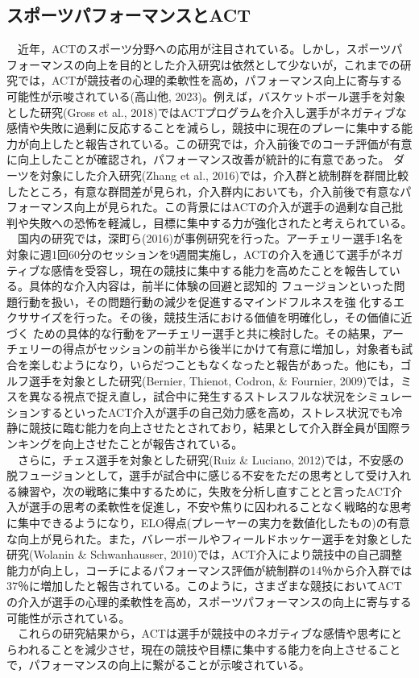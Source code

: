 \documentclass[12pt,a4paper,xelatex,ja=standard]{bxjsarticle}
\begin{document}
\hypertarget{ux30b9ux30ddux30fcux30c4ux30d1ux30d5ux30a9ux30fcux30deux30f3ux30b9ux3068act}{%
\subsection{スポーツパフォーマンスとACT}\label{ux30b9ux30ddux30fcux30c4ux30d1ux30d5ux30a9ux30fcux30deux30f3ux30b9ux3068act}}

　近年，ACTのスポーツ分野への応用が注目されている。しかし，スポーツパフォーマンスの向上を目的とした介入研究は依然として少ないが，これまでの研究では，ACTが競技者の心理的柔軟性を高め，パフォーマンス向上に寄与する可能性が示唆されている(高山他,
2023)。例えば，バスケットボール選手を対象とした研究(Gross et al.,
2018)ではACTプログラムを介入し選手がネガティブな感情や失敗に過剰に反応することを減らし，競技中に現在のプレーに集中する能力が向上したと報告されている。この研究では，介入前後でのコーチ評価が有意に向上したことが確認され，パフォーマンス改善が統計的に有意であった。
ダーツを対象にした介入研究(Zhang et al.,
2016)では，介入群と統制群を群間比較したところ，有意な群間差が見られ，介入群内においても，介入前後で有意なパフォーマンス向上が見られた。この背景にはACTの介入が選手の過剰な自己批判や失敗への恐怖を軽減し，目標に集中する力が強化されたと考えられている。\\
　国内の研究では，深町ら(2016)が事例研究を行った。アーチェリー選手1名を対象に週1回60分のセッションを9週間実施し，ACTの介入を通じて選手がネガティブな感情を受容し，現在の競技に集中する能力を高めたことを報告している。具体的な介入内容は，前半に体験の回避と認知的
フュージョンといった問題行動を扱い，その問題行動の減少を促進するマインドフルネスを強
化するエクササイズを行った。その後，競技生活における価値を明確化し，その価値に近づく
ための具体的な行動をアーチェリー選手と共に検討した。その結果，アーチェリーの得点がセッションの前半から後半にかけて有意に増加し，対象者も試合を楽しむようになり，いらだつこともなくなったと報告があった。他にも，ゴルフ選手を対象とした研究(Bernier,
Thienot, Codron, \& Fournier,
2009)では，ミスを異なる視点で捉え直し，試合中に発生するストレスフルな状況をシミュレーションするといったACT介入が選手の自己効力感を高め，ストレス状況でも冷静に競技に臨む能力を向上させたとされており，結果として介入群全員が国際ランキングを向上させたことが報告されている。\\
　さらに，チェス選手を対象とした研究(Ruiz \& Luciano,
2012)では，不安感の脱フュージョンとして，選手が試合中に感じる不安をただの思考として受け入れる練習や，次の戦略に集中するために，失敗を分析し直すことと言ったACT介入が選手の思考の柔軟性を促進し，不安や焦りに囚われることなく戦略的な思考に集中できるようになり，ELO得点(プレーヤーの実力を数値化したもの)の有意な向上が見られた。また，バレーボールやフィールドホッケー選手を対象とした研究(Wolanin
\& Schwanhausser,
2010)では，ACT介入により競技中の自己調整能力が向上し，コーチによるパフォーマンス評価が統制群の14％から介入群では37％に増加したと報告されている。このように，さまざまな競技においてACTの介入が選手の心理的柔軟性を高め，スポーツパフォーマンスの向上に寄与する可能性が示されている。\\
　これらの研究結果から，ACTは選手が競技中のネガティブな感情や思考にとらわれることを減少させ，現在の競技や目標に集中する能力を向上させることで，パフォーマンスの向上に繋がることが示唆されている。
\end{document}
